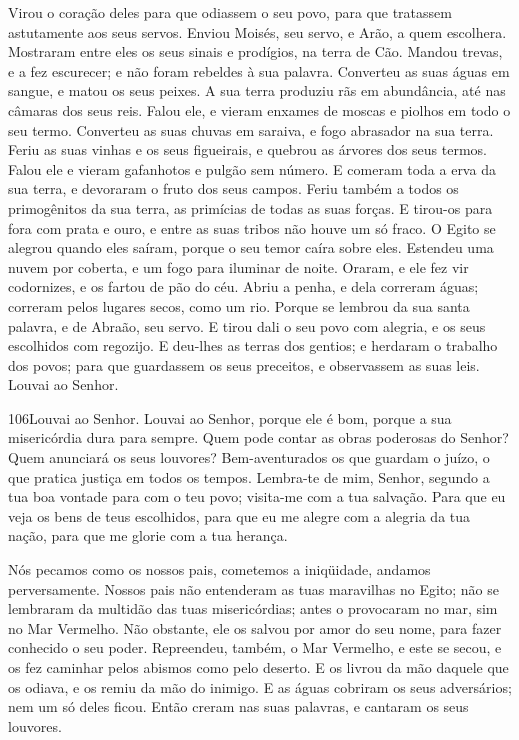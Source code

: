 Virou o coração deles para que odiassem o seu povo, para que
tratassem astutamente aos seus servos. Enviou Moisés, seu
servo, e Arão, a quem escolhera. Mostraram entre eles os seus
sinais e prodígios, na terra de Cão. Mandou trevas, e a fez
escurecer; e não foram rebeldes à sua palavra. Converteu as
suas águas em sangue, e matou os seus peixes. A sua terra
produziu rãs em abundância, até nas câmaras dos seus reis.
Falou ele, e vieram enxames de moscas e piolhos em todo o seu
termo. Converteu as suas chuvas em saraiva, e fogo abrasador
na sua terra. Feriu as suas vinhas e os seus figueirais, e
quebrou as árvores dos seus termos. Falou ele e vieram
gafanhotos e pulgão sem número. E comeram toda a erva da sua
terra, e devoraram o fruto dos seus campos. Feriu também a
todos os primogênitos da sua terra, as primícias de todas as suas
forças. E tirou-os para fora com prata e ouro, e entre as
suas tribos não houve um só fraco. O Egito se alegrou quando
eles saíram, porque o seu temor caíra sobre eles. Estendeu
uma nuvem por coberta, e um fogo para iluminar de noite.
Oraram, e ele fez vir codornizes, e os fartou de pão do céu.
Abriu a penha, e dela correram águas; correram pelos lugares
secos, como um rio. Porque se lembrou da sua santa palavra, e
de Abraão, seu servo. E tirou dali o seu povo com alegria, e
os seus escolhidos com regozijo. E deu-lhes as terras dos
gentios; e herdaram o trabalho dos povos; para que guardassem
os seus preceitos, e observassem as suas leis. Louvai ao Senhor.

\bigskip

\lettrine{106}{}Louvai ao Senhor. Louvai ao Senhor, porque ele
é bom, porque a sua misericórdia dura para sempre. Quem pode
contar as obras poderosas do Senhor? Quem anunciará os seus
louvores? Bem-aventurados os que guardam o juízo, o que pratica
justiça em todos os tempos. Lembra-te de mim, Senhor, segundo a
tua boa vontade para com o teu povo; visita-me com a tua salvação.
Para que eu veja os bens de teus escolhidos, para que eu me
alegre com a alegria da tua nação, para que me glorie com a tua
herança.

Nós pecamos como os nossos pais, cometemos a iniqüidade, andamos
perversamente. Nossos pais não entenderam as tuas maravilhas no
Egito; não se lembraram da multidão das tuas misericórdias; antes o
provocaram no mar, sim no Mar Vermelho. Não obstante, ele os
salvou por amor do seu nome, para fazer conhecido o seu poder.
Repreendeu, também, o Mar Vermelho, e este se secou, e os fez
caminhar pelos abismos como pelo deserto. E os livrou da mão
daquele que os odiava, e os remiu da mão do inimigo. E as
águas cobriram os seus adversários; nem um só deles ficou.
Então creram nas suas palavras, e cantaram os seus louvores.

